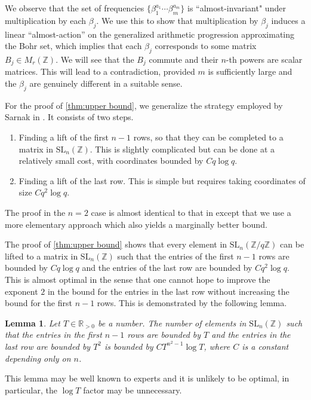 \documentclass[12pt, a4paper]{amsart}
\numberwithin{equation}{section}
\newtheorem{lemma}[theorem]{Lemma}
\theoremstyle{definition}
\newcommand{\R}{\mathbb{R}}
\newcommand{\Z}{\mathbb{Z}}
\newcommand{\SL}{\mathrm{SL}}
\begin{document}
We observe that the set of frequencies $\{\beta_1^{a_1}\cdots\beta_m^{a_m}\}$
is ``almost-invariant" under multiplication by each $\beta_j$.
We use this to show that multiplication by $\beta_j$ induces a linear ``almost-action'' on the
generalized arithmetic progression approximating the Bohr set,
which implies that each $\beta_j$ corresponds to some matrix $B_j\in M_r(\Z)$.
We will see that the $B_j$ commute and their $n$-th powers are scalar matrices.
This will lead to a contradiction, provided $m$ is sufficiently large and the
$\beta_j$ are genuinely different in a suitable sense. 


For the proof of \cref{thm:upper bound}, we generalize the strategy employed by Sarnak in \cite{sarnak2015lettermiller}. 
It consists of two steps.
\begin{enumerate}
\item Finding a lift of the first $n-1$ rows, so that they can be completed
to a matrix in $\SL_{n}(\Z)$. This is slightly complicated but can be done at a relatively small
cost, with coordinates bounded by $Cq\log q$. 
\item Finding a lift of the last row. This is simple but requires taking coordinates of size
$Cq^{2}\log q$.
\end{enumerate}

The proof in the $n=2$ case is almost identical to that in \cite{sarnak2015lettermiller}
except that we use a more elementary approach which also yields a marginally better
bound.

The proof of \cref{thm:upper bound} shows that every element in $\SL_n(\Z/q\Z)$ can be lifted to a matrix in $\SL_n(\Z)$ such that the entries of the first $n-1$ rows are bounded by $Cq\log q$ and the entries of the last row are bounded by $Cq^2 \log q$. 
This is almost optimal in the sense that one cannot hope to improve the exponent
$2$ in the bound for the entries in the last row without increasing the bound
for the first $n-1$ rows.
This is demonstrated by the following lemma.

\begin{lemma}\label{lem:skewed counting}
Let $T\in\R_{>0}$ be a number.
The number of elements in $\SL_n(\Z)$ such that the entries in the first $n-1$ rows are bounded by $T$ and the entries in the last row are bounded by $T^2$ is bounded by $CT^{n^2-1}\log T$, where $C$ is a constant depending only on $n$.
\end{lemma}

This lemma may be well known to experts and it is unlikely to be optimal, in particular,
the $\log T$ factor may be unnecessary.
\end{document}
